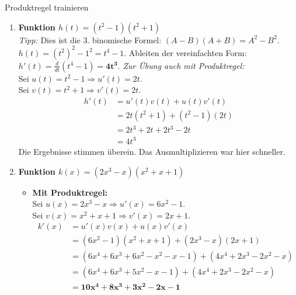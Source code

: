 \begin{loesungsumgebung}{Produktregel trainieren}
\begin{enumerate}[label=(\alph*)]
    \item \textbf{Funktion $h(t) = (t^2-1)(t^2+1)$} \\
    \textit{Tipp:} Dies ist die 3. binomische Formel: $(A-B)(A+B) = A^2-B^2$.
    $h(t) = (t^2)^2 - 1^2 = t^4 - 1$.
    Ableiten der vereinfachten Form:
    $h'(t) = \frac{d}{dt}(t^4 - 1) = \mathbf{4t^3}$.
    \textit{Zur Übung auch mit Produktregel:} \\
    Sei $u(t) = t^2-1 \Rightarrow u'(t) = 2t$. \\
    Sei $v(t) = t^2+1 \Rightarrow v'(t) = 2t$.
    \begin{align*}
    h'(t) &= u'(t)v(t) + u(t)v'(t) \\
          &= 2t(t^2+1) + (t^2-1)(2t) \\
          &= 2t^3 + 2t + 2t^3 - 2t \\
          &= 4t^3
    \end{align*}
    Die Ergebnisse stimmen überein. Das Ausmultiplizieren war hier schneller.

    \item \textbf{Funktion $k(x) = (2x^3-x)(x^2+x+1)$}
    \begin{itemize}
        \item \textbf{Mit Produktregel:} \\
        Sei $u(x) = 2x^3-x \Rightarrow u'(x) = 6x^2-1$. \\
        Sei $v(x) = x^2+x+1 \Rightarrow v'(x) = 2x+1$.
        \begin{align*}
        k'(x) &= u'(x)v(x) + u(x)v'(x) \\
              &= (6x^2-1)(x^2+x+1) + (2x^3-x)(2x+1) \\
              &= (6x^4 + 6x^3 + 6x^2 - x^2 - x - 1) + (4x^4 + 2x^3 - 2x^2 - x) \\
              &= (6x^4 + 6x^3 + 5x^2 - x - 1) + (4x^4 + 2x^3 - 2x^2 - x) \\
              &= \mathbf{10x^4 + 8x^3 + 3x^2 - 2x - 1}
        \end{align*}
    \end{itemize}


\end{enumerate}
\end{loesungsumgebung}
